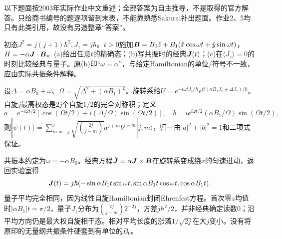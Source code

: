 以下题面按2003年实际作业中文重述；全部答案为自主推导，不是取得的官方解答。只给商书编号的题逐项留到末表，不能靠熟悉Sakurai补出题面。作业2、5均只有此类引用，故没有另造整章“答案”。

\begin{exercise}
初态$J^2=j(j+1)\hbar^2,J_z=j\hbar$。$t>0$施加$\boldsymbol{B}=B_0\hat z+B_1(\hat x\cos\omega t+\hat y\sin\omega t)$，$H=-\alpha\boldsymbol{J}\cdot\boldsymbol{B}$。(a)给出任意$t$的精确态；(b)写共振时的经典$\boldsymbol{J}(t)$；(c)在$\langle J_z\rangle=0$的时刻比较经典与量子。原(b)印“$\omega=\alpha$”，与给定Hamiltonian的单位/符号不一致，应由实际共振条件解释。
\end{exercise}
\begin{solution}
设$\Delta=\alpha B_0+\omega$、$\Omega=\sqrt{\Delta^2+(\alpha B_1)^2}$。旋转系给$U=e^{-i\omega tJ_z/\hbar}e^{it(\alpha B_1J_x+\Delta J_z)/\hbar}$。自旋$j$最高权态是$2j$个自旋$1/2$的完全对称积；定义
\[
 a=e^{-i\omega t/2}[\cos(\Omega t/2)+i(\Delta/\Omega)\sin(\Omega t/2)],\quad
 b=ie^{i\omega t/2}(\alpha B_1/\Omega)\sin(\Omega t/2),
\]
则$|\psi(t)\rangle=\sum_{m=-j}^j\sqrt{\binom{2j}{j-m}}a^{j+m}b^{j-m}|j,m\rangle$，归一由$|a|^2+|b|^2=1$和二项式保证。

共振本约定为$\omega=-\alpha B_0$。经典方程$\dot{\boldsymbol{J}}=\alpha\boldsymbol{J}\times\boldsymbol{B}$在旋转系变成绕$x$的匀速进动，返回实验室得
\[
 \boldsymbol{J}(t)=j\hbar(-\sin\alpha B_1t\sin\omega t,
 \sin\alpha B_1t\cos\omega t,\cos\alpha B_1t).
\]
量子平均完全相同，因为线性自旋Hamiltonian封闭Ehrenfest方程。首次零$z$均值时$|\alpha B_1|t=\pi/2$，量子$J_z$分布为$\binom{2j}{j-m}2^{-2j}$，方差$j\hbar^2/2$，并非经典确定读数0；沿平均方向仍是最大权自旋相干态。相对平均长度的涨落$1/\sqrt{2j}$在大$j$变小。没有将原印的无量纲共振条件硬套到有单位的$B_0$。
\end{solution}

